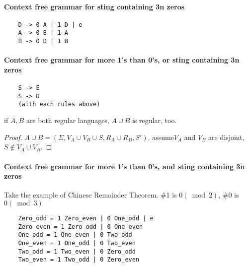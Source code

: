 \paragraph{Context free grammar for sting containing 3n zeros}

\begin{verbatim}
    D -> 0 A | 1 D | e
    A -> 0 B | 1 A
    B -> 0 D | 1 B
\end{verbatim}

\paragraph{Context free grammar for more 1's than 0's, or sting containing 3n zeros}

\begin{verbatim}
    S -> E
    S -> D
    (with each rules above)
\end{verbatim}

\begin{theorem}[Combination]\label{th:regular-combination}
if $A, B$ are both regular
  languages, $A \cup B$ is regular, too.
\end{theorem}

\begin{proof}
\(A\cup B = (\Sigma, V_A\cup V_B \cup {S}, R_A \cup R_B, S')\), assume\(V_A\) and \(V_B\) are disjoint, \(S \not \in V_A \cup V_B\).
\end{proof}

\paragraph{Context free grammar for more 1's than 0's, and sting containing 3n zeros}

  Take the example of Chinese Remainder Theorem. \#1 is $0(\bmod 2)$, \#0 is
 $0(\bmod 3)$

\begin{verbatim}
    Zero_odd = 1 Zero_even | 0 One_odd | e
    Zero_even = 1 Zero_odd | 0 One_even
    One_odd = 1 One_even | 0 Two_odd
    One_even = 1 One_odd | 0 Two_even
    Two_odd = 1 Two_even | 0 Zero_odd
    Two_even = 1 Two_odd | 0 Zero_even
\end{verbatim}


